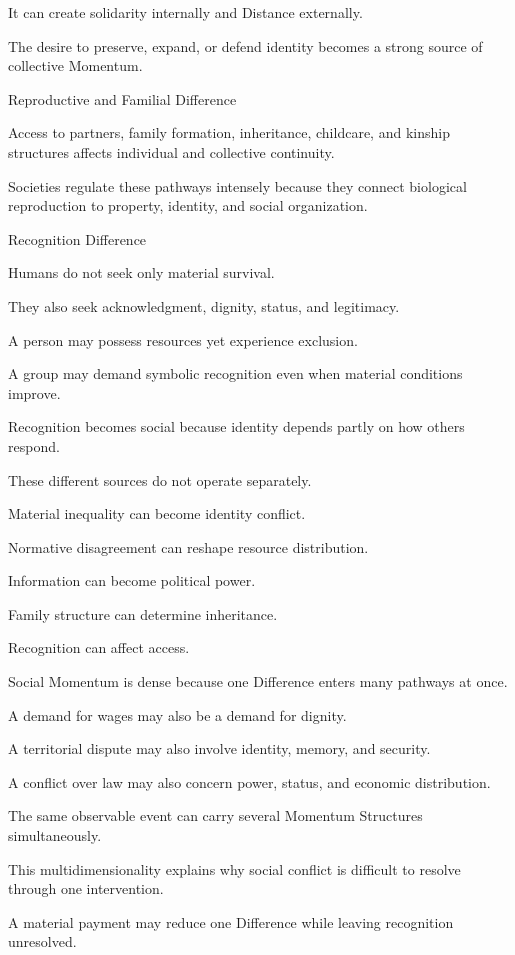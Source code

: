 It can create solidarity internally and Distance externally.

The desire to preserve, expand, or defend identity becomes a strong source of collective Momentum.

Reproductive and Familial Difference

Access to partners, family formation, inheritance, childcare, and kinship structures affects individual and collective continuity.

Societies regulate these pathways intensely because they connect biological reproduction to property, identity, and social organization.

Recognition Difference

Humans do not seek only material survival.

They also seek acknowledgment, dignity, status, and legitimacy.

A person may possess resources yet experience exclusion.

A group may demand symbolic recognition even when material conditions improve.

Recognition becomes social because identity depends partly on how others respond.

These different sources do not operate separately.

Material inequality can become identity conflict.

Normative disagreement can reshape resource distribution.

Information can become political power.

Family structure can determine inheritance.

Recognition can affect access.

Social Momentum is dense because one Difference enters many pathways at once.

A demand for wages may also be a demand for dignity.

A territorial dispute may also involve identity, memory, and security.

A conflict over law may also concern power, status, and economic distribution.

The same observable event can carry several Momentum Structures simultaneously.

This multidimensionality explains why social conflict is difficult to resolve through one intervention.

A material payment may reduce one Difference while leaving recognition unresolved.

